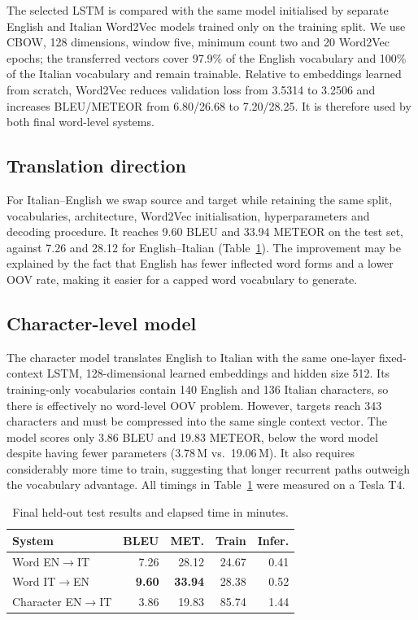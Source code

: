 \documentclass[sigconf,nonacm]{acmart}
\begin{document}
The selected LSTM is compared with the same model initialised by separate
English and Italian Word2Vec models trained only on the training split. We use
CBOW, 128 dimensions, window five, minimum count two and 20 Word2Vec epochs;
the transferred vectors cover 97.9\% of the English vocabulary and 100\% of the
Italian vocabulary and remain trainable. Relative to embeddings learned from
scratch, Word2Vec reduces validation loss from 3.5314 to 3.2506 and increases
BLEU/METEOR from 6.80/26.68 to 7.20/28.25. It is therefore used by both final
word-level systems.

\subsection{Translation direction}
\label{sec:direction}

For Italian--English we swap source and target while retaining the same split,
vocabularies, architecture, Word2Vec initialisation, hyperparameters and
decoding procedure. It reaches 9.60 BLEU and 33.94 METEOR on the test set,
against 7.26 and 28.12 for English--Italian (Table~\ref{tab:finalnmt}). The
improvement may be explained by the fact that English has fewer inflected word
forms and a lower OOV rate, making it easier for a capped word vocabulary to
generate.

\subsection{Character-level model}
\label{sec:char}

The character model translates English to Italian with the same one-layer
fixed-context LSTM, 128-dimensional learned embeddings and hidden size 512. Its
training-only vocabularies contain 140 English and 136 Italian characters, so
there is effectively no word-level OOV problem. However, targets reach 343
characters and must be compressed into the same single context vector. The
model scores only 3.86 BLEU and 19.83 METEOR, below the
word model despite having fewer parameters (3.78\,M vs.\ 19.06\,M). It also
requires considerably more time to train, suggesting
that longer recurrent paths outweigh the vocabulary advantage. All timings in
Table~\ref{tab:finalnmt} were measured on a Tesla T4.

\begin{table}[h]
\caption{Final held-out test results and elapsed time in minutes.}
\label{tab:finalnmt}
\scriptsize
\setlength{\tabcolsep}{3pt}
\begin{tabular}{lrrrr}
\toprule
\textbf{System} & \textbf{BLEU} & \textbf{MET.} &
\textbf{Train} & \textbf{Infer.} \\
\midrule
Word EN$\rightarrow$IT & 7.26 & 28.12 & 24.67 & 0.41 \\
Word IT$\rightarrow$EN & \textbf{9.60} & \textbf{33.94} & 28.38 & 0.52 \\
Character EN$\rightarrow$IT & 3.86 & 19.83 & 85.74 & 1.44 \\
\bottomrule
\end{tabular}
\end{table}
\end{document}
